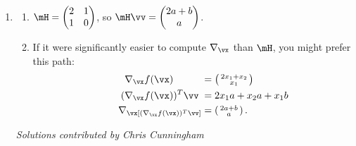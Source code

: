 \documentclass{article}
\newcommand{\twovector}[2]{ \begin{smallmatrix} #1 \\ #2 \end{smallmatrix} }
\newcommand{\ptwovector}[2]{ \left( \twovector{#1}{#2} \right) }
\begin{document}
\begin{enumerate}
\item \label{DFN_ex_Christianson_solution}
\begin{enumerate}
    \item $\mH = \begin{pmatrix} 2 & 1 \\ 1 & 0 \end{pmatrix}$, so $\mH \vv = \begin{pmatrix} 2a+b \\ a \end{pmatrix}$.
    \item If it were significantly easier to compute $\nabla_\vx$ than $\mH$, you might prefer this path:\begin{align*}
        \phantom{\nabla_\vx[(}\nabla_\vx f(\vx)\phantom{)^T \vv]} & = \ptwovector{2x_1 + x_2}{x_1} \\
        \phantom{\nabla_\vx[}(\nabla_\vx f(\vx))^T \vv\phantom{]} & = 2x_1a + x_2a + x_1b \\
                 \nabla_\vx[(\nabla_\vx f(\vx))^T \vv]            & = \ptwovector{2a+b}{a}.
    \end{align*}
\end{enumerate}

{\em Solutions contributed by Chris Cunningham}

\end{enumerate}
\end{document}
